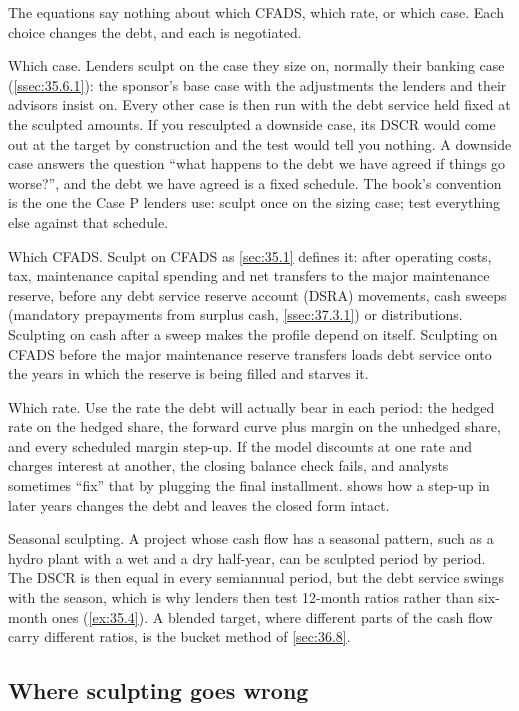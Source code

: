 The equations say nothing about which CFADS, which rate, or which case. Each choice changes the debt, and each is negotiated.

Which case. Lenders sculpt on the case they size on, normally their banking case (\cref{ssec:35.6.1}): the sponsor's base case with the adjustments the lenders and their advisors insist on. Every other case is then run with the debt service held fixed at the sculpted amounts. If you resculpted a downside case, its DSCR would come out at the target by construction and the test would tell you nothing. A downside case answers the question ``what happens to the debt we have agreed if things go worse?'', and the debt we have agreed is a fixed schedule. The book's convention is the one the Case P lenders use: sculpt once on the sizing case; test everything else against that schedule.

Which CFADS. Sculpt on CFADS as \cref{sec:35.1} defines it: after operating costs, tax, maintenance capital spending and net transfers to the major maintenance reserve, before any debt service reserve account (DSRA) movements, cash sweeps (mandatory prepayments from surplus cash, \cref{ssec:37.3.1}) or distributions. Sculpting on cash after a sweep makes the profile depend on itself. Sculpting on CFADS before the major maintenance reserve transfers loads debt service onto the years in which the reserve is being filled and starves it.

Which rate. Use the rate the debt will actually bear in each period: the hedged rate on the hedged share, the forward curve plus margin on the unhedged share, and every scheduled margin step-up. If the model discounts at one rate and charges interest at another, the closing balance check fails, and analysts sometimes ``fix'' that by plugging the final installment.  shows how a step-up in later years changes the debt and leaves the closed form intact.

Seasonal sculpting. A project whose cash flow has a seasonal pattern, such as a hydro plant with a wet and a dry half-year, can be sculpted period by period. The DSCR is then equal in every semiannual period, but the debt service swings with the season, which is why lenders then test 12-month ratios rather than six-month ones (\cref{ex:35.4}). A blended target, where different parts of the cash flow carry different ratios, is the bucket method of \cref{sec:36.8}.

\subsection{Where sculpting goes wrong}\label{ssec:36.2.4}

